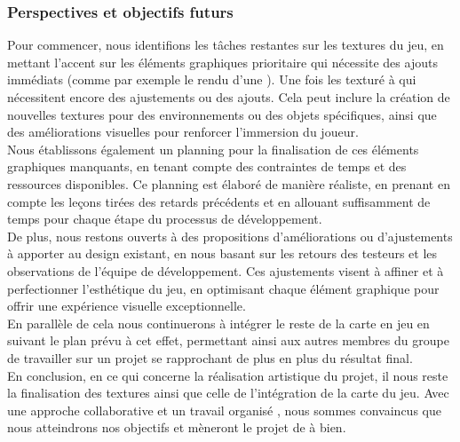 \subsubsection*{\hspace*{0.6cm}Perspectives et objectifs futurs}

Pour commencer, nous identifions les tâches restantes sur les textures du jeu, en mettant l'accent sur les éléments graphiques prioritaire qui nécessite des ajouts immédiats (comme par exemple le rendu d'une ).
Une fois les texturé à  qui nécessitent encore des ajustements ou des ajouts.
Cela peut inclure la création de nouvelles textures pour des environnements ou des objets spécifiques, ainsi que des améliorations visuelles pour renforcer l'immersion du joueur.
\\

Nous établissons également un planning pour la finalisation de ces éléments graphiques manquants, en tenant compte des contraintes de temps et des ressources disponibles.
Ce planning est élaboré de manière réaliste, en prenant en compte les leçons tirées des retards précédents et en allouant suffisamment de temps pour chaque étape du processus de développement.
\\

De plus, nous restons ouverts à des propositions d'améliorations ou d'ajustements à apporter au design existant, en nous basant sur les retours des testeurs et les observations de l'équipe de développement.
Ces ajustements visent à affiner et à perfectionner l'esthétique du jeu, en optimisant chaque élément graphique pour offrir une expérience visuelle exceptionnelle.
\\

En parallèle de cela nous continuerons à intégrer le reste de la carte en jeu en suivant le plan prévu à cet effet, permettant ainsi aux autres membres du groupe de travailler sur un projet se rapprochant de plus en plus du résultat final.
\\

En conclusion, en ce qui concerne la réalisation artistique du projet, il nous reste la finalisation des textures ainsi que celle de l'intégration de la carte du jeu.
Avec une approche collaborative et un travail organisé , nous sommes convaincus que nous atteindrons nos objectifs et mèneront le projet de \gameName à bien.
\\

